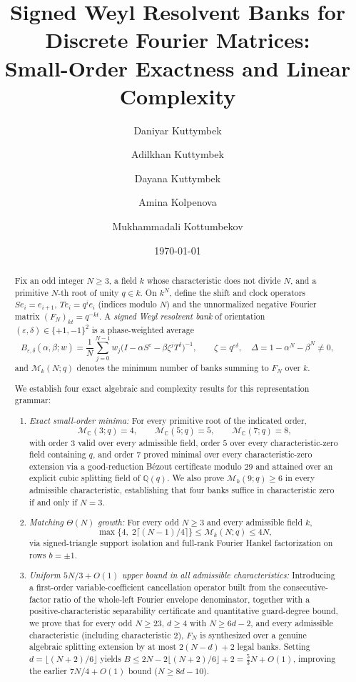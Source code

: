 \documentclass[11pt,reqno]{amsart}
\title[Signed Weyl Resolvent Banks for Discrete Fourier Matrices]{Signed Weyl Resolvent Banks for Discrete Fourier Matrices:\\Small-Order Exactness and Linear Complexity}
\author[D. Kuttymbek]{Daniyar Kuttymbek}
\author[A. Kuttymbek]{Adilkhan Kuttymbek}
\author[D. Kuttymbek]{Dayana Kuttymbek}
\author[A. Kolpenova]{Amina Kolpenova}
\author[M. Kottumbekov]{Mukhammadali Kottumbekov}
\date{\today}
\numberwithin{equation}{section}
\theoremstyle{definition}
\theoremstyle{remark}
\newcommand{\C}{\mathbb{C}}
\newcommand{\Q}{\mathbb{Q}}
\newcommand{\eps}{\varepsilon}
\newcommand{\M}{\mathcal{M}}
\begin{document}
\begin{abstract}
Fix an odd integer $N\ge 3$, a field $k$ whose characteristic does not divide $N$, and a primitive $N$-th root of unity $q\in k$. On $k^N$, define the shift and clock operators $Se_i=e_{i+1}$, $Te_i=q^i e_i$ (indices modulo $N$) and the unnormalized negative Fourier matrix $(F_N)_{kt}=q^{-kt}$. A \emph{signed Weyl resolvent bank} of orientation $(\eps,\delta)\in\{+1,-1\}^2$ is a phase-weighted average
\[
B_{\eps,\delta}(\alpha,\beta;w)
= \frac{1}{N}\sum_{j=0}^{N-1} w_j \bigl(I - \alpha S^\eps - \beta\zeta^j T^\delta\bigr)^{-1},
\qquad \zeta = q^{\eps\delta},\quad \Delta = 1 - \alpha^N - \beta^N \ne 0,
\]
and $\M_k(N;q)$ denotes the minimum number of banks summing to $F_N$ over $k$.

We establish four exact algebraic and complexity results for this representation grammar:
\begin{enumerate}[label=(\arabic*),leftmargin=1.8em]
\item \emph{Exact small-order minima:} For every primitive root of the indicated order,
\[
\M_{\C}(3;q) = 4,\qquad \M_{\C}(5;q) = 5,\qquad \M_{\C}(7;q) = 8,
\]
with order $3$ valid over every admissible field, order $5$ over every characteristic-zero field containing $q$, and order $7$ proved minimal over every characteristic-zero extension via a good-reduction B\'ezout certificate modulo $29$ and attained over an explicit cubic splitting field of $\Q(q)$. We also prove $\M_k(9;q)\ge 6$ in every admissible characteristic, establishing that four banks suffice in characteristic zero if and only if $N=3$.
\item \emph{Matching $\Theta(N)$ growth:} For every odd $N\ge 3$ and every admissible field $k$,
\[
\max\bigl\{4,\; 2\lceil(N-1)/4\rceil\bigr\} \le \M_k(N;q) \le 4N,
\]
via signed-triangle support isolation and full-rank Fourier Hankel factorization on rows $b=\pm 1$.
\item \emph{Uniform $5N/3 + O(1)$ upper bound in all admissible characteristics:} Introducing a first-order variable-coefficient cancellation operator built from the consecutive-factor ratio of the whole-left Fourier envelope denominator, together with a positive-characteristic separability certificate and quantitative guard-degree bound, we prove that for every odd $N\ge 23$, $d\ge 4$ with $N\ge 6d-2$, and every admissible characteristic (including characteristic $2$), $F_N$ is synthesized over a genuine algebraic splitting extension by at most $2(N-d)+2$ legal banks. Setting $d=\lfloor(N+2)/6\rfloor$ yields $B \le 2N - 2\lfloor(N+2)/6\rfloor + 2 = \frac{5}{3}N + O(1)$, improving the earlier $7N/4 + O(1)$ bound ($N\ge 8d-10$).

\end{enumerate}
\end{abstract}
\end{document}
